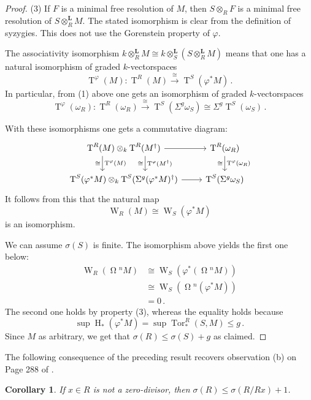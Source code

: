 \documentclass{amsart}
\numberwithin{equation}{section}
\theoremstyle{plain}
\newtheorem{corollary}[equation]{Corollary}
\theoremstyle{definition}
\theoremstyle{remark}
\newcommand{\hh}{\operatorname{H}}
\newcommand{\lescot}{\operatorname{W}}
\newcommand{\lotimes}{\otimes^{\mathbf L}}
\newcommand{\syz}{\operatorname{\Omega}\!}
\newcommand{\tee}{\operatorname{T}}
\newcommand{\tor}{\operatorname{Tor}}
\begin{document}
\begin{proof}
(3) If $F$ is a minimal free resolution of $M$, then $S\otimes_RF$ is a minimal free resolution of $S\lotimes_RM$.  The stated isomorphism is clear from the definition of syzygies. This does not use the Gorenstein property of $\varphi$.

The associativity isomorphism $k\lotimes_R M\cong k\lotimes_S (S\lotimes_RM)$ means that one has a natural isomorphism of graded $k$-vectorspaces
\[
\tee^{\varphi}(M)\colon \tee^R(M)\xrightarrow{\ \cong\ } \tee^S(\varphi^*M)\,.
\]
In particular, from (1) above one gets an isomorphism of graded $k$-vectorspaces
\[
\tee^{\varphi}(\omega_R) \colon \tee^R(\omega_R)\xrightarrow{\ \cong\ } 
    \tee^S(\Sigma^{g}\omega_S) \cong \Sigma^g \tee^S(\omega_S)\,.
\]

With these isomorphisms one gets a commutative diagram:
\[
\begin{tikzcd} %
    \tee^R(M)  \otimes_k  \tee^R(M^\dagger) \arrow[d, xshift=-25pt,"\tee^{\varphi}(M)", "\cong" swap] 
                \arrow[d, xshift=25pt,"\tee^{\varphi}(M^\dagger)", "\cong" swap] \arrow[r] 
                    & \tee^R(\omega_R)\arrow[d, "\tee^{\varphi}(\omega_R)", "\cong" swap] \\
    \tee^S(\varphi^*M) \otimes_k  \tee^S (\Sigma^g (\varphi^*M)^\dagger )  
            \arrow[r] 
                    & \tee^S(\Sigma^g \omega_S)       
\end{tikzcd}
\]
It follows from this that the natural map
\[
\lescot_R(M)\cong \lescot_S(\varphi^*M)
\]
is an isomorphism. 
    
We can assume $\sigma(S)$ is finite.  The isomorphism above yields the first one below:
\begin{align*}
    \lescot_R(\syz^{n}M) 
        &\cong \lescot_S(\varphi^*(\syz^nM)) \\
        &\cong \lescot_S(\syz^{n}(\varphi^*M)) \\
        & =0\,.
\end{align*}
The second one holds by property (3), whereas the equality holds because 
\[
\sup\hh_*(\varphi^*M)=\sup\tor^R_*(S,M) \le g\,.
\]
Since $M$ as arbitrary, we get that $\sigma(R)\le \sigma(S)+g$ as claimed.
\end{proof}

The following consequence of the preceding result recovers observation (b) on Page 288 of \cite{Lescot:1986}.

\begin{corollary}
\label{co:sigma-nzd}
    If $x\in R$ is not a zero-divisor, then $\sigma(R)\leq \sigma(R/Rx)+1$.
\end{corollary}
\end{document}
